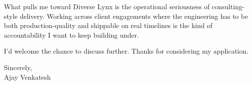 \documentclass[letterpaper,11pt]{article}
\begin{document}
What pulls me toward Diverse Lynx is the operational seriousness of consulting-style delivery. Working across client engagements where the engineering has to be both production-quality and shippable on real timelines is the kind of accountability I want to keep building under.

I'd welcome the chance to discuss further. Thanks for considering my application.

\vspace{12pt}
Sincerely, \\
Ajay Venkatesh
\end{document}

